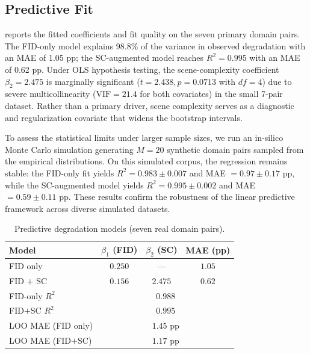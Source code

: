 \documentclass[10pt,twocolumn,letterpaper]{article}
\begin{document}
\subsection{Predictive Fit}
 reports the fitted coefficients and fit quality on the seven primary domain pairs. The FID-only model explains 98.8\% of the variance in observed degradation with an MAE of 1.05 pp; the SC-augmented model reaches $R^2 = 0.995$ with an MAE of 0.62 pp. Under OLS hypothesis testing, the scene-complexity coefficient $\beta_2 = 2.475$ is marginally significant ($t = 2.438, p = 0.0713$ with $df=4$) due to severe multicollinearity ($\text{VIF} = 21.4$ for both covariates) in the small 7-pair dataset. Rather than a primary driver, scene complexity serves as a diagnostic and regularization covariate that widens the bootstrap intervals.

To assess the statistical limits under larger sample sizes, we run an in-silico Monte Carlo simulation generating $M=20$ synthetic domain pairs sampled from the empirical distributions. On this simulated corpus, the regression remains stable: the FID-only fit yields $R^2 = 0.983 \pm 0.007$ and MAE $= 0.97 \pm 0.17$ pp, while the SC-augmented model yields $R^2 = 0.995 \pm 0.002$ and MAE $= 0.59 \pm 0.11$ pp. These results confirm the robustness of the linear predictive framework across diverse simulated datasets.

\begin{table}[htbp]
\centering
\caption{Predictive degradation models (seven real domain pairs).}
\label{tab:regression}
\begin{tabular}{@{}lccc@{}}
\toprule
\textbf{Model} & $\beta_1$ (FID) & $\beta_2$ (SC) & \textbf{MAE (pp)} \\
\midrule
FID only & $0.250$ & --- & $1.05$ \\
FID $+$ SC & $0.156$ & $2.475$ & $0.62$ \\
\midrule
FID-only $R^2$ & \multicolumn{3}{c}{$0.988$} \\
FID$+$SC $R^2$ & \multicolumn{3}{c}{$0.995$} \\
LOO MAE (FID only) & \multicolumn{3}{c}{$1.45$ pp} \\
LOO MAE (FID$+$SC) & \multicolumn{3}{c}{$1.17$ pp} \\
\bottomrule
\end{tabular}
\end{table}
\end{document}
